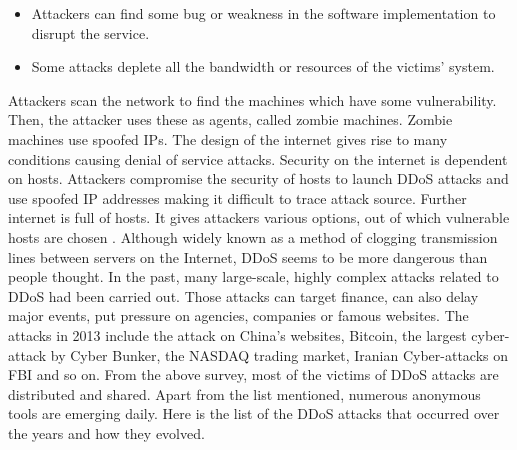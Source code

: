 \documentclass[twocolumn]{article}
\begin{document}
\begin{itemize}
\item Attackers can find some bug or weakness in the software implementation to disrupt the service.
\item Some attacks deplete all the bandwidth or resources of the victims' system.
\end{itemize}
Attackers scan the network to find the machines which have some vulnerability. Then, the attacker uses these as agents, called zombie machines. Zombie machines use spoofed IPs. The design of the internet gives rise to many conditions causing denial of service attacks. Security on the internet is dependent on hosts. Attackers compromise the security of hosts to launch DDoS
attacks and use spoofed IP addresses making it difficult to trace attack source. Further internet is full of hosts. It
gives attackers various options, out of which vulnerable hosts are chosen \cite{deshmukh2015understanding}. Although widely known as a method of clogging transmission lines between servers on the Internet, DDoS seems to be more dangerous than people thought. In the past, many large-scale, highly complex attacks related to DDoS had been carried out. Those attacks can target finance, can also delay major events, put pressure on agencies, companies or famous websites. The attacks in 2013 include the attack on China’s websites, Bitcoin, the largest cyber-attack by Cyber Bunker, the NASDAQ trading market, Iranian Cyber-attacks on FBI and so on. From the above survey, most of the victims of DDoS
attacks are distributed and shared. Apart from the list mentioned, numerous anonymous tools are emerging daily. Here is the list of the DDoS attacks that occurred over the years and how they evolved.
\end{document}
